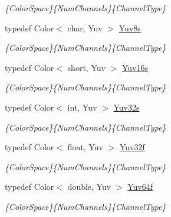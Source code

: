 \begin{DoxyCompactItemize}
\begin{DoxyCompactList}\small\item\em \{Color\-Space\}\{Num\-Channels\}\{Channel\-Type\} \end{DoxyCompactList}\item 
\hypertarget{group___color_types_gaaff8f245adcf9351e2c5adec71027cd5}{typedef Color$<$ char, Yuv $>$ \hyperlink{group___color_types_gaaff8f245adcf9351e2c5adec71027cd5}{Yuv8s}}\label{group___color_types_gaaff8f245adcf9351e2c5adec71027cd5}

\begin{DoxyCompactList}\small\item\em \{Color\-Space\}\{Num\-Channels\}\{Channel\-Type\} \end{DoxyCompactList}\item 
\hypertarget{group___color_types_ga5353986a1fb36e7d31acde633107f35c}{typedef Color$<$ short, Yuv $>$ \hyperlink{group___color_types_ga5353986a1fb36e7d31acde633107f35c}{Yuv16s}}\label{group___color_types_ga5353986a1fb36e7d31acde633107f35c}

\begin{DoxyCompactList}\small\item\em \{Color\-Space\}\{Num\-Channels\}\{Channel\-Type\} \end{DoxyCompactList}\item 
\hypertarget{group___color_types_ga07ba8b667b5773081e4b91e881af38fc}{typedef Color$<$ int, Yuv $>$ \hyperlink{group___color_types_ga07ba8b667b5773081e4b91e881af38fc}{Yuv32s}}\label{group___color_types_ga07ba8b667b5773081e4b91e881af38fc}

\begin{DoxyCompactList}\small\item\em \{Color\-Space\}\{Num\-Channels\}\{Channel\-Type\} \end{DoxyCompactList}\item 
\hypertarget{group___color_types_ga6cd60f7afed7dc2a9586688608d2a84c}{typedef Color$<$ float, Yuv $>$ \hyperlink{group___color_types_ga6cd60f7afed7dc2a9586688608d2a84c}{Yuv32f}}\label{group___color_types_ga6cd60f7afed7dc2a9586688608d2a84c}

\begin{DoxyCompactList}\small\item\em \{Color\-Space\}\{Num\-Channels\}\{Channel\-Type\} \end{DoxyCompactList}\item 
\hypertarget{group___color_types_ga1d6900cbc431a41c4e88c8ce31e78955}{typedef Color$<$ double, Yuv $>$ \hyperlink{group___color_types_ga1d6900cbc431a41c4e88c8ce31e78955}{Yuv64f}}\label{group___color_types_ga1d6900cbc431a41c4e88c8ce31e78955}

\begin{DoxyCompactList}\small\item\em \{Color\-Space\}\{Num\-Channels\}\{Channel\-Type\} \end{DoxyCompactList}\end{DoxyCompactItemize}


